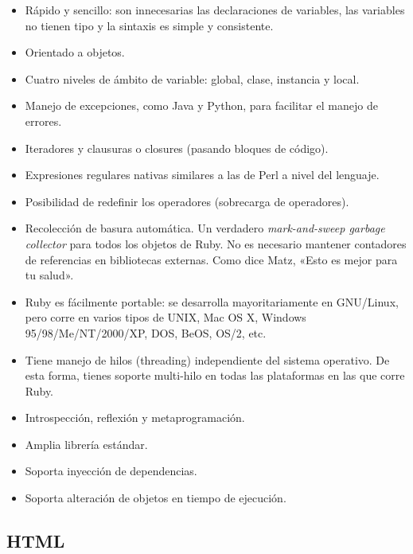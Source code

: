       \begin{itemize}
        \item Rápido y sencillo: son innecesarias las declaraciones de variables, las variables no tienen tipo y la sintaxis es simple y consistente.
        \item Orientado a objetos.
        \item Cuatro niveles de ámbito de variable: global, clase, instancia y local.
        \item Manejo de excepciones, como Java y Python, para facilitar el manejo de errores.
        \item Iteradores y clausuras o closures (pasando bloques de código).
        \item Expresiones regulares nativas similares a las de Perl a nivel del lenguaje.
        \item Posibilidad de redefinir los operadores (sobrecarga de operadores).
        \item Recolección de basura automática. Un verdadero {\it mark-and-sweep garbage collector} para todos los objetos de Ruby. No es necesario mantener contadores de referencias en bibliotecas externas. Como dice Matz, «Esto es mejor para tu salud».
        \item Ruby es fácilmente portable: se desarrolla mayoritariamente en GNU/Linux, pero corre en varios tipos de UNIX, Mac OS X, Windows 95/98/Me/NT/2000/XP, DOS, BeOS, OS/2, etc.
        \item Tiene manejo de hilos (threading) independiente del sistema operativo. De esta forma, tienes soporte multi-hilo en todas las plataformas en las que corre Ruby.
        \item Introspección, reflexión y metaprogramación.
        \item Amplia librería estándar.
        \item Soporta inyección de dependencias.
        \item Soporta alteración de objetos en tiempo de ejecución.
      \end{itemize}
    
    
  
  
  \subsection{HTML} %
    \label{sub:tec_html}
    
